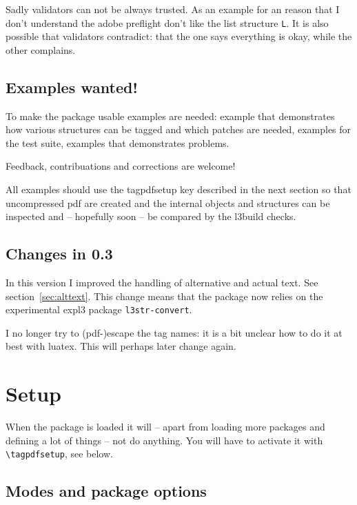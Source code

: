 \documentclass[DIV=12,parskip=half-,bibliography=totoc]{scrartcl}
\begin{document}

Sadly validators can not be always trusted. As an example for an reason that I don't understand the adobe preflight don't like the list structure \texttt{L}.
It is also possible that validators contradict: that the one says everything is okay, while the other complains.

\subsection{Examples wanted!}
To make the package usable examples are needed: example that demonstrates how various structures can be tagged and which patches are needed, examples for the test suite, examples that demonstrates problems.

\begin{tcolorbox}
Feedback, contribuations and corrections are welcome!
\end{tcolorbox}

All examples should use the tagpdfsetup key  described in the next section so that uncompressed pdf are created and the internal objects and structures can be inspected and -- hopefully soon -- be compared by the l3build checks.

\subsection{Changes in 0.3}

In this version I improved the handling of alternative and actual text. See section~\ref{sec:alttext}. This change means that the package now relies on the experimental expl3 package \texttt{l3str-convert}.

I no longer try to (pdf-)escape the tag names: it is a bit unclear how to do it at best with luatex. This will perhaps later change again.

\section{Setup}

When the package is loaded it will -- apart from loading more packages and defining a lot of things -- not do anything. You will have to activate it with \verb+\tagpdfsetup+, see below.

\subsection{Modes and package options}
\end{document}
